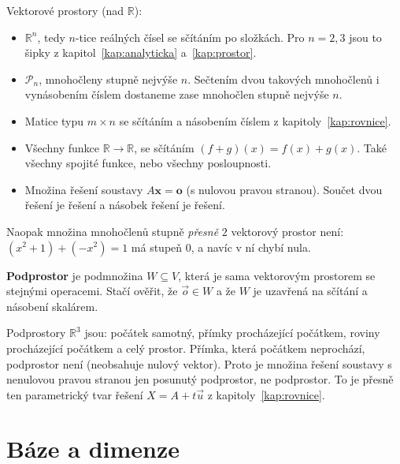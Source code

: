 \begin{example}
  Vektorové prostory (nad $\mathbb{R}$):
  \begin{itemize}
    \item $\mathbb{R}^n$, tedy $n$-tice reálných čísel se sčítáním po složkách. Pro $n = 2, 3$ jsou to šipky z kapitol~\ref{kap:analyticka} a~\ref{kap:prostor}.
    \item $\mathcal{P}_n$, mnohočleny stupně nejvýše $n$. Sečtením dvou takových mnohočlenů i vynásobením číslem dostaneme zase mnohočlen stupně nejvýše $n$.
    \item Matice typu $m\times n$ se sčítáním a násobením číslem z kapitoly~\ref{kap:rovnice}.
    \item Všechny funkce $\mathbb{R}\to\mathbb{R}$, se sčítáním $(f + g)(x) = f(x) + g(x)$. Také všechny spojité funkce, nebo všechny posloupnosti.
    \item Množina řešení soustavy $A\mathbf{x} = \mathbf{o}$ (s nulovou pravou stranou). Součet dvou řešení je řešení a násobek řešení je řešení.
  \end{itemize}
  Naopak množina mnohočlenů stupně \textit{přesně} $2$ vektorový prostor není: $(x^2 + 1) + (-x^2) = 1$ má stupeň $0$, a navíc v ní chybí nula.
\end{example}

\begin{definitionbox}
  \textbf{Podprostor} je podmnožina $W\subseteq V$, která je sama vektorovým prostorem se stejnými operacemi. Stačí ověřit, že $\vec{o}\in W$ a že $W$ je uzavřená na sčítání a násobení skalárem.
\end{definitionbox}

Podprostory $\mathbb{R}^3$ jsou: počátek samotný, přímky procházející počátkem, roviny procházející počátkem a celý prostor. Přímka, která počátkem neprochází, podprostor není (neobsahuje nulový vektor). Proto je množina řešení soustavy s nenulovou pravou stranou jen posunutý podprostor, ne podprostor. To je přesně ten parametrický tvar řešení $X = A + t\vec{u}$ z kapitoly~\ref{kap:rovnice}.

\section{Báze a dimenze}

